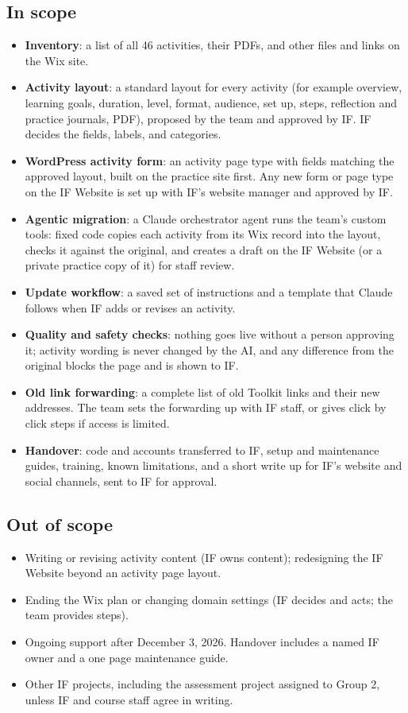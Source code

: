 \subsection*{In scope}
\begin{itemize}
  \item \textbf{Inventory}: a list of all 46 activities, their PDFs, and other files and links on the Wix site.
  \item \textbf{Activity layout}: a standard layout for every activity (for example overview, learning goals, duration, level, format, audience, set up, steps, reflection and practice journals, PDF), proposed by the team and approved by IF. IF decides the fields, labels, and categories.
  \item \textbf{WordPress activity form}: an activity page type with fields matching the approved layout, built on the practice site first. Any new form or page type on the IF Website is set up with IF's website manager and approved by IF.
  \item \textbf{Agentic migration}: a Claude orchestrator agent runs the team's custom tools: fixed code copies each activity from its Wix record into the layout, checks it against the original, and creates a draft on the IF Website (or a private practice copy of it) for staff review.
  \item \textbf{Update workflow}: a saved set of instructions and a template that Claude follows when IF adds or revises an activity.
  \item \textbf{Quality and safety checks}: nothing goes live without a person approving it; activity wording is never changed by the AI, and any difference from the original blocks the page and is shown to IF.
  \item \textbf{Old link forwarding}: a complete list of old Toolkit links and their new addresses. The team sets the forwarding up with IF staff, or gives click by click steps if access is limited.
  \item \textbf{Handover}: code and accounts transferred to IF, setup and maintenance guides, training, known limitations, and a short write up for IF's website and social channels, sent to IF for approval.
\end{itemize}

\subsection*{Out of scope}
\begin{itemize}
  \item Writing or revising activity content (IF owns content); redesigning the IF Website beyond an activity page layout.
  \item Ending the Wix plan or changing domain settings (IF decides and acts; the team provides steps).
  \item Ongoing support after December 3, 2026. Handover includes a named IF owner and a one page maintenance guide.
  \item Other IF projects, including the assessment project assigned to Group 2, unless IF and course staff agree in writing.
\end{itemize}

